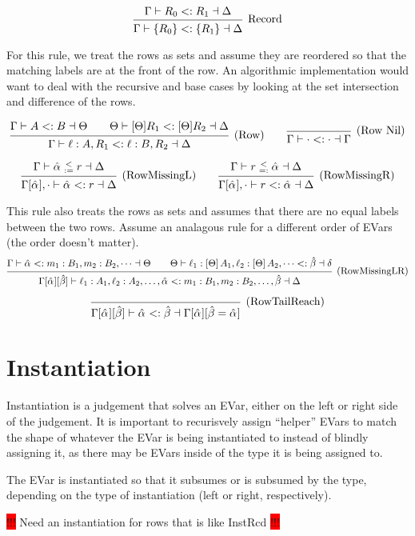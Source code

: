 \documentclass{article}
\newcommand{\consider}[1]{\colorbox{red}{!!!} #1 \colorbox{red}{!!!}}
\newcommand{\subtype}{<:}
\newcommand{\instLSymbol}{\;\substack{<\\:=}\;}
\newcommand{\instRSymbol}{\;\substack{<\\=:}\;}
\newcommand{\ev}{\hat}
\newcommand{\spc}{\qquad}
\newcommand{\apply}[1]{\left[#1\right]}
\newcommand{\eva}[1][]{\ev \alpha_{#1}}
\newcommand{\evb}{\ev \beta}
\newcommand{\subtypes}[4]{#1 \vdash #2 \subtype #3 \dashv #4}
\newcommand{\instL}[4]{#1 \vdash #2 \instLSymbol #3 \dashv #4}
\newcommand{\instR}[4]{#1 \vdash #2 \instRSymbol #3 \dashv #4}
\newcommand{\deduct}[3][]
{
  \begin{prooftree}
    \hypo{#2}
    \infer1[\text{#1}]{#3}
  \end{prooftree}
}
\begin{document}
\[
  \deduct[Record]{\subtypes{\Gamma}{R_0}{R_1}{\Delta}}{\subtypes{\Gamma}{\{R_0\}}{\{R_1\}}{\Delta}}
\]

For this rule, we treat the rows as sets and assume they are reordered so that
the matching labels are at the front of the row. An algorithmic implementation
would want to deal with the recursive and base cases by looking at the set
intersection and difference of the rows.

\[
  \deduct[(Row)]
  {\subtypes{\Gamma}{A}{B}{\Theta}
    \spc
    \subtypes{\Theta}{[\Theta] R_1}{[\Theta] R_2}{\Delta}
  }
  { \subtypes{\Gamma}{\ell : A, R_1}{\ell : B, R_2}{\Delta} }
  \spc
  \deduct[(Row Nil)]{}{ \subtypes{\Gamma}{\cdot}{\cdot}{\Gamma} }
\]

\[
  \deduct[(RowMissingL)]
  {\instL{\Gamma}{\eva}{r}{\Delta}}
  {\subtypes{\Gamma[\eva], \cdot}{\eva}{r}{\Delta}}
  \spc
  \deduct[(RowMissingR)]
  {\instR{\Gamma}{r}{\eva}{\Delta}}
  {\subtypes{\Gamma[\eva], \cdot}{r}{\eva}{\Delta}}
\]

This rule also treats the rows as sets and assumes that there are no equal
labels between the two rows. Assume an analagous rule for a different order of
EVars (the order doesn't matter).
\[
  \deduct[(RowMissingLR)]
  {\subtypes{\Gamma}{\eva}{m_1 : B_1, m_2 : B_2, \dots}{\Theta} \spc
    \subtypes{\Theta}{\ell_1 : \apply\Theta A_1, \ell_2 : \apply\Theta A_2,
      \dots}{\evb}{\delta}}
  {\subtypes{\Gamma[\eva][\evb]}{\ell_1 : A_1, \ell_2 : A_2, \dots, \eva}{m_1 :
      B_1, m_2 : B_2, \dots, \evb}{\Delta}}
\]

\[
  \deduct[(RowTailReach)]
  {}
  {\subtypes{\Gamma[\eva][\evb]}{\eva}{\evb}{\Gamma[\eva][\evb=\eva]}}
\]


\section{Instantiation}

Instantiation is a judgement that solves an EVar, either on the left or right
side of the judgement. It is important to recurisvely assign ``helper'' EVars to
match the shape of whatever the EVar is being instantiated to instead of blindly
assigning it, as there may be EVars inside of the type it is being assigned to.

The EVar is instantiated so that it subsumes or is subsumed by the type,
depending on the type of instantiation (left or right, respectively).

\consider{Need an instantiation for rows that is like InstRcd}
\end{document}
